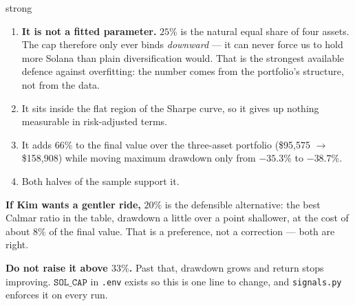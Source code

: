 \documentclass[11pt,a4paper]{article}
\begin{document}
\begin{resultbox}[Decision: 25\%]{strong}
\begin{enumerate}[leftmargin=1.5em, topsep=2pt]
    \item \textbf{It is not a fitted parameter.} $25\%$ is the natural
          equal share of four assets. The cap therefore only ever binds
          \emph{downward} --- it can never force us to hold more Solana
          than plain diversification would. That is the strongest
          available defence against overfitting: the number comes from
          the portfolio's structure, not from the data.
    \item It sits inside the flat region of the Sharpe curve, so it
          gives up nothing measurable in risk-adjusted terms.
    \item It adds $66\%$ to the final value over the three-asset
          portfolio (\$95{,}575 $\rightarrow$ \$158{,}908) while moving
          maximum drawdown only from $-35.3\%$ to $-38.7\%$.
    \item Both halves of the sample support it.
\end{enumerate}

\vspace{0.5em}
\textbf{If Kim wants a gentler ride,} $20\%$ is the defensible
alternative: the best Calmar ratio in the table, drawdown a little over
a point shallower, at the cost of about $8\%$ of the final value. That
is a preference, not a correction --- both are right.

\vspace{0.4em}
\textbf{Do not raise it above $33\%$.} Past that, drawdown grows and
return stops improving. $\texttt{SOL\_CAP}$ in \texttt{.env} exists so
this is one line to change, and \texttt{signals.py} enforces it on
every run.
\end{resultbox}
\end{document}
